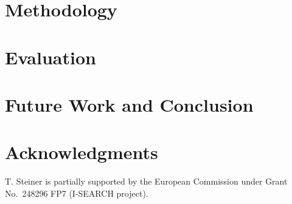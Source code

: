 \documentclass[runningheads,a4paper]{llncs}
\begin{document}
\section{Methodology}

\section{Evaluation}

\section{Future Work and Conclusion}

\section*{Acknowledgments}
\small
T. Steiner is partially supported by the European Commission
under Grant No.~248296 FP7 (\mbox{I-SEARCH} project).

\linespread{1}


\end{document}
